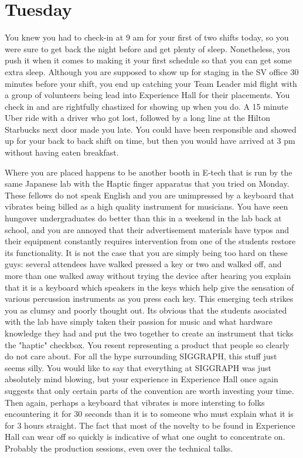 \documentclass[../main.tex]{subfiles}
\begin{document}
\section{Tuesday}

You knew you had to check-in at 9 am for your first of two shifts today, so you were sure to get back the night before and get plenty of sleep. Nonetheless, you push it when it comes to making it your first schedule so that you can get some extra sleep. Although you are supposed to show up for staging in the SV office 30 minutes before your shift, you end up catching your Team Leader mid flight with a group of volunteers being lead into Experience Hall for their placements. You check in and are rightfully chastized for showing up when you do. A 15 minute Uber ride with a driver who got lost, followed by a long line at the Hilton Starbucks next door made you late. You could have been responsible and showed up for your back to back shift on time, but then you would have arrived at 3 pm without having eaten breakfast.

Where you are placed happens to be another booth in E-tech that is run by the same Japanese lab with the Haptic finger apparatus that you tried on Monday. These fellows do not speak English and you are unimpressed by a keyboard that vibrates being billed as a high quality instrument for musicians. You have seen hungover undergraduates do better than this in a weekend in the lab back at school, and you are annoyed that their advertisement materials have typos and their equipment constantly requires intervention from one of the students restore its functionality. It is not the case that you are simply being too hard on these guys: several attendees have walked pressed a key or two and walked off, and more than one walked away without trying the device after hearing you explain that it is a keyboard which speakers in the keys which help give the sensation of various percussion instruments as you press each key. This emerging tech strikes you as clumsy and poorly thought out. Its obvious that the students asociated with the lab have simply taken their passion for music and what hardware knowledge they had and put the two together to create an instrument that ticks the "haptic" checkbox. You resent representing a product that people so clearly do not care about. For all the hype surrounding SIGGRAPH, this stuff just seems silly. You would like to say that everything at SIGGRAPH was just absolutely mind blowing, but your experience in Experience Hall once again suggests that only certain parts of the convention are worth investing your time. Then again, perhaps a keyboard that vibrates is more intersting to folks encountering it for 30 seconds than it is to someone who must explain what it is for 3 hours straight. The fact that most of the novelty to be found in Experience Hall can wear off so quickly is indicative of what one ought to concentrate on. Probably the production sessions, even over the technical talks.
\end{document}
